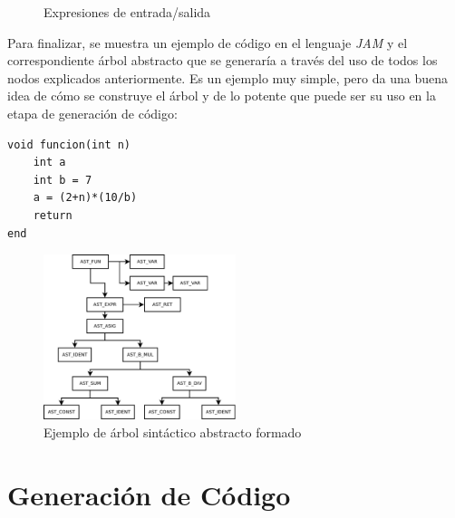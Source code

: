 \documentclass[a4paper,10pt]{article}
\begin{document}
\begin{figure}[H]
  \centering
  \hspace{11mm}
  \caption{Expresiones de entrada/salida}
  \label{fig:exprio}
\end{figure}

Para finalizar, se muestra un ejemplo de código en el lenguaje \textit{JAM} y el correspondiente árbol abstracto que se generaría a través del uso de todos los nodos explicados anteriormente. Es un ejemplo muy simple, pero da una buena idea de cómo se construye el árbol y de lo potente que puede ser su uso en la etapa de generación de código:

\begin{lstlisting}[language=jam]
void funcion(int n)
	int a
	int b = 7
	a = (2+n)*(10/b)
	return
end
\end{lstlisting}
\begin{figure}[H]
  \centering
	\includegraphics[width=0.5\textwidth]{images/ast.pdf}
  \caption{Ejemplo de árbol sintáctico abstracto formado}
  \label{fig:ast}
\end{figure}

\section{Generación de Código}
\end{document}
